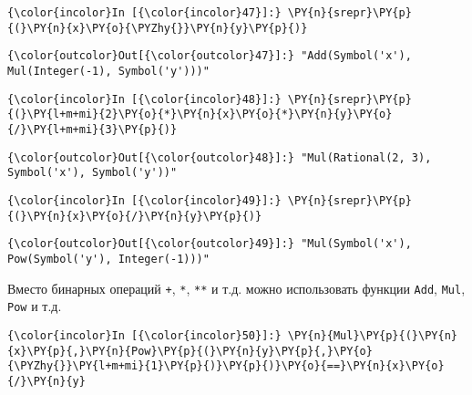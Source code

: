     \begin{Verbatim}[commandchars=\\\{\}]
{\color{incolor}In [{\color{incolor}47}]:} \PY{n}{srepr}\PY{p}{(}\PY{n}{x}\PY{o}{\PYZhy{}}\PY{n}{y}\PY{p}{)}
\end{Verbatim}

            \begin{Verbatim}[commandchars=\\\{\}]
{\color{outcolor}Out[{\color{outcolor}47}]:} "Add(Symbol('x'), Mul(Integer(-1), Symbol('y')))"
\end{Verbatim}
        
    \begin{Verbatim}[commandchars=\\\{\}]
{\color{incolor}In [{\color{incolor}48}]:} \PY{n}{srepr}\PY{p}{(}\PY{l+m+mi}{2}\PY{o}{*}\PY{n}{x}\PY{o}{*}\PY{n}{y}\PY{o}{/}\PY{l+m+mi}{3}\PY{p}{)}
\end{Verbatim}

            \begin{Verbatim}[commandchars=\\\{\}]
{\color{outcolor}Out[{\color{outcolor}48}]:} "Mul(Rational(2, 3), Symbol('x'), Symbol('y'))"
\end{Verbatim}
        
    \begin{Verbatim}[commandchars=\\\{\}]
{\color{incolor}In [{\color{incolor}49}]:} \PY{n}{srepr}\PY{p}{(}\PY{n}{x}\PY{o}{/}\PY{n}{y}\PY{p}{)}
\end{Verbatim}

            \begin{Verbatim}[commandchars=\\\{\}]
{\color{outcolor}Out[{\color{outcolor}49}]:} "Mul(Symbol('x'), Pow(Symbol('y'), Integer(-1)))"
\end{Verbatim}
        
    Вместо бинарных операций \texttt{+}, \texttt{*}, \texttt{**} и т.д.
можно использовать функции \texttt{Add}, \texttt{Mul}, \texttt{Pow} и
т.д.

    \begin{Verbatim}[commandchars=\\\{\}]
{\color{incolor}In [{\color{incolor}50}]:} \PY{n}{Mul}\PY{p}{(}\PY{n}{x}\PY{p}{,}\PY{n}{Pow}\PY{p}{(}\PY{n}{y}\PY{p}{,}\PY{o}{\PYZhy{}}\PY{l+m+mi}{1}\PY{p}{)}\PY{p}{)}\PY{o}{==}\PY{n}{x}\PY{o}{/}\PY{n}{y}
\end{Verbatim}

